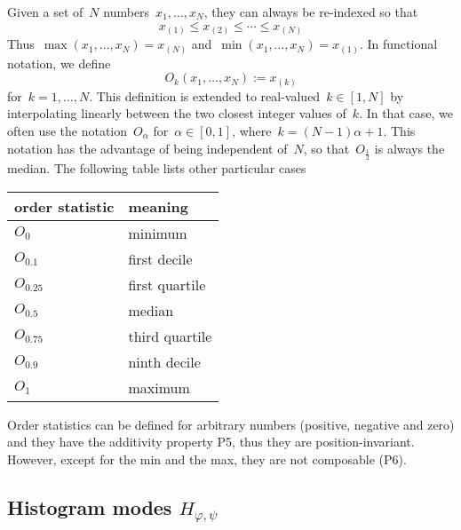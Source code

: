 \documentclass[a4paper]{article}
\begin{document}
Given a set of~$N$ numbers~$x_1,\ldots,x_N$, they can always be
re-indexed so that
\[
	x_{(1)} \le x_{(2)} \le \cdots \le x_{(N)}
\]
Thus~$\max(x_1,\ldots,x_N)=x_{(N)}$
and~$\min(x_1,\ldots,x_N)=x_{(1)}$.  In functional notation, we
define
\[
	O_k(x_1,\ldots,x_N) := x_{(k)}
\]
for~$k=1,\ldots,N$.  This definition is extended to
real-valued~$k\in[1,N]$ by interpolating linearly between the
two closest integer values of~$k$.  In that case, we often use the
notation~$O_{\alpha}$ for~$\alpha\in[0,1]$, where~$k=(N-1)\alpha+1$.
This notation has the advantage of being independent of~$N$, so
that~$O_{\frac{1}{2}}$ is always the median.  The following table
lists other particular cases

\medskip

\begin{tabular}{l|l}
	order statistic & meaning \\
	\hline
	$O_0$ & minimum \\
	$O_{0.1}$ & first decile \\
	$O_{0.25}$ & first quartile \\
	$O_{0.5}$ & median \\
	$O_{0.75}$ & third quartile \\
	$O_{0.9}$ & ninth decile \\
	$O_1$ & maximum \\
\end{tabular}

\medskip

Order statistics can be defined for arbitrary numbers (positive,
negative and zero) and they have the additivity property P5, thus
they are position-invariant.  However, except for the min and the
max, they are not composable (P6).


\subsection{Histogram modes $H_{\varphi,\psi}$}
\end{document}
